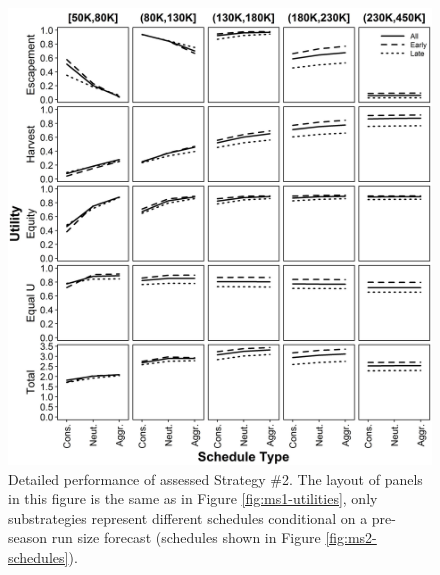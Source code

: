 \documentclass[12pt,]{book}
\theoremstyle{definition}
\theoremstyle{definition}
\theoremstyle{definition}
\theoremstyle{remark}
\begin{document}
\begin{singlespace}
\clearpage
\begin{figure}
  \centering
  \includegraphics{img/Ch3/Values_2.jpg}
  \caption{Detailed performance of assessed Strategy \#2. The layout of panels in this figure is the same as in Figure \ref{fig:ms1-utilities}, only substrategies represent different schedules conditional on a pre-season run size forecast (schedules shown in Figure \ref{fig:ms2-schedules}).}
  \label{fig:ms2-utilities}
\end{figure}


\end{singlespace}
\end{document}
